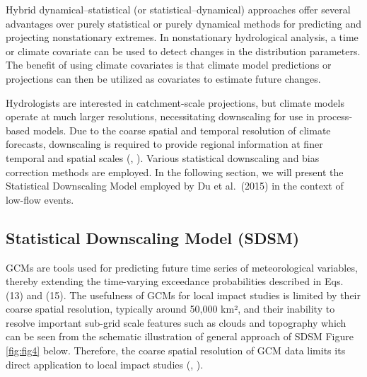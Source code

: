 \documentclass[
]{krantz}
\begin{document}
Hybrid dynamical--statistical (or statistical--dynamical) approaches offer several advantages over purely statistical or purely dynamical methods for predicting and projecting nonstationary extremes. In nonstationary hydrological analysis, a time or climate covariate can be used to detect changes in the distribution parameters. The benefit of using climate covariates is that climate model predictions or projections can then be utilized as covariates to estimate future changes.

Hydrologists are interested in catchment-scale projections, but climate models operate at much larger resolutions, necessitating downscaling for use in process-based models. Due to the coarse spatial and temporal resolution of climate forecasts, downscaling is required to provide regional information at finer temporal and spatial scales (\citet{Fowler2007}, \citet{Tian2017}). Various statistical downscaling and bias correction methods are employed. In the following section, we will present the Statistical Downscaling Model employed by Du et al.~(2015) in the context of low-flow events.

\subsection{Statistical Downscaling Model (SDSM)}\label{statistical-downscaling-model-sdsm}

GCMs are tools used for predicting future time series of meteorological variables, thereby extending the time-varying exceedance probabilities described in Eqs. (13) and (15). The usefulness of GCMs for local impact studies is limited by their coarse spatial resolution, typically around 50,000 km², and their inability to resolve important sub-grid scale features such as clouds and topography which can be seen from the schematic illustration of general approach of SDSM Figure \ref{fig:fig4} below. Therefore, the coarse spatial resolution of GCM data limits its direct application to local impact studies (\citet{Wilby2002}, \citet{Wilby2007}).
\end{document}
